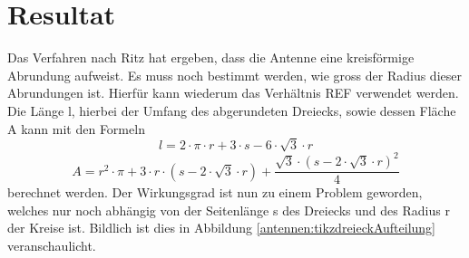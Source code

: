 %
%
% 
%
%

\section{Resultat\label{antennen:resultat}}

Das Verfahren nach Ritz hat ergeben, dass die Antenne eine kreisförmige Abrundung aufweist. Es muss noch bestimmt werden, wie gross der Radius dieser Abrundungen ist. Hierfür kann wiederum das Verhältnis REF verwendet werden. Die Länge l, hierbei der Umfang des abgerundeten Dreiecks, sowie dessen Fläche A kann mit den Formeln
\begin{equation}
	l=2\cdot{\pi}\cdot{r}+3\cdot{s}-6\cdot{\sqrt{3}}\cdot{r}
	\label{antennen:Länge}
\end{equation}
\begin{equation}
	A=r^2\cdot{\pi}+3\cdot{r}\cdot{(s-2\cdot{\sqrt{3}}\cdot{r})}+\frac{\sqrt{3}\cdot{(s-2\cdot{\sqrt{3}}\cdot{r})^2}}{4}
	\label{antennen:Fläche}
\end{equation}
berechnet werden.
Der Wirkungsgrad ist nun zu einem Problem geworden, welches nur noch abhängig von der Seitenlänge s des Dreiecks und des Radius r der Kreise ist. Bildlich ist dies in Abbildung \ref{antennen:tikzdreieckAufteilung} veranschaulicht.
